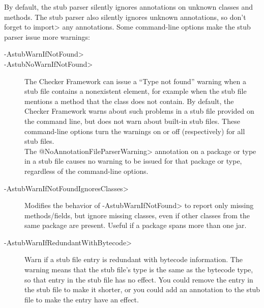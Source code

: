 


By default, the stub parser silently ignores
annotations on unknown classes and methods.
The stub parser also silently ignores unknown annotations, so don't forget to
\<import> any annotations.
Some command-line options make the stub parser issue more warnings:

\begin{description}
\item[\<-AstubWarnIfNotFound>]
\item[\<-AstubNoWarnIfNotFound>]
  The Checker Framework can issue a ``Type not found'' warning
  when a stub file contains a nonexistent
  element, for example when the stub file mentions a method that the class
  does not contain.
  By default, the Checker Framework warns about such problems in a stub
  file provided on the command line, but does not warn about built-in stub files.
  These command-line options turn the warnings on or off (respectively) for
  all stub files. \\
  The \<@NoAnnotationFileParserWarning> annotation on a package or type in a stub file
  causes no warning to be issued for that package or type, regardless of
  the command-line options.


\item[\<-AstubWarnIfNotFoundIgnoresClasses>]
  Modifies the behavior of \<-AstubWarnIfNotFound>
  to report only missing methods/fields, but ignore missing classes, even if
  other classes from the same package are present.
  Useful if a package spans more than one jar.

\item[\<-AstubWarnIfRedundantWithBytecode>]
  Warn if a stub file entry is redundant with bytecode information.  The
  warning means that the stub file's type is the same as the bytecode type,
  so that entry in the stub file has no effect.  You could remove the
  entry in the stub file to make it shorter, or you could add an annotation
  to the stub file to make the entry have an effect.


\end{description}
